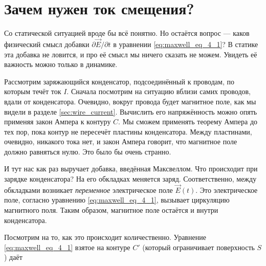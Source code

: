 \documentclass[a4paper,12pt]{article}
\newcommand{\pt}{\partial}
\begin{document}
\section{Зачем нужен ток смещения?}
\label{sec:displacement_current}

Со статической ситуацией вроде бы всё понятно. Но остаётся вопрос ---
каков физический смысл добавки $\pt \vec{E} / \pt t$ в уравнении
\eqref{eq:maxwell_eq_4_1}? В статике эта добавка не ловится, и про её
смысл мы ничего сказать не можем. Увидеть её важность можно только в
динамике. 

\begin{figure}[h]
  \centering
  \label{fig:displacement}
\end{figure}

Рассмотрим заряжающийся конденсатор, подсоединённый к проводам, по
которым течёт ток $I$. Сначала посмотрим на ситуацию вблизи самих
проводов, вдали от конденсатора. Очевидно, вокруг провода будет
магнитное поле, как мы видели в разделе
\ref{sec:wire_current}. Вычислить его напряжённость можно опять
применяя закон Ампера к контуру $C$. Мы сможем применять теорему
Ампера до тех пор, пока контур не пересечёт пластины
конденсатора. Между пластинами, очевидно, никакого тока нет, и закон
Ампера говорит, что магнитное поле должно равняться нулю. Это было бы
очень странно.

И тут нас как раз выручает добавка, введённая
Максвеллом. Что происходит при зарядке конденсатора? На его обкладках
меняется заряд. Соответственно, между обкладками возникает
\textit{переменное} электрическое поле $\vec{E}(t)$. Это электрическое
поле, согласно уравнению \eqref{eq:maxwell_eq_4_1}, вызывает
циркуляцию магнитного поля. Таким образом, магнитное поле остаётся и
внутри конденсатора. 

Посмотрим на то, как это происходит количественно. Уравнение
\eqref{eq:maxwell_eq_4_1} взятое на контуре $C'$ (который ограничивает
поверхность $S$) даёт
\end{document}
